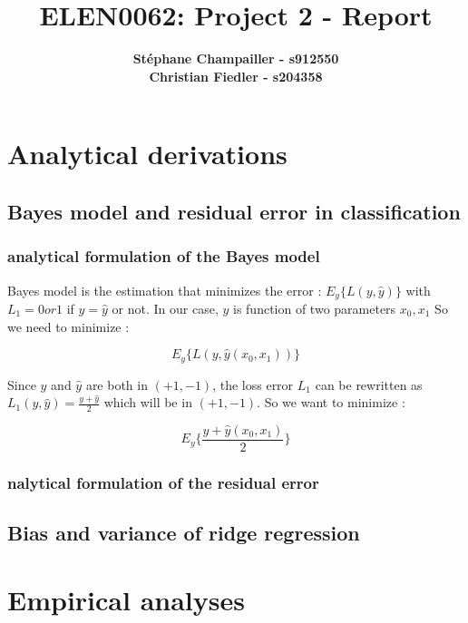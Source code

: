 \documentclass{article}
\begin{document}

\title{\Large{ELEN0062: Project 2 - Report}}
\vspace{1cm}
\author{\small{\bf Stéphane Champailler - s912550 } \\ \small{\bf Christian Fiedler - s204358}}



\maketitle


\def\picwidth{8cm}

\section{Analytical derivations}
\subsection{Bayes model and residual error in classification}
\subsubsection{analytical formulation of the Bayes model}

Bayes model is the estimation that minimizes the error :
$E_y\{ L(y,\hat{y})\}$ with  $L_1 = 0 or 1 $ if $y = \hat{y}$ or not.
In our case, $y$ is function of two parameters $x_0,x_1$
So we need to minimize :

$$ E_y\{ L(y,\hat{y}(x_0,x_1))\} $$

Since $y$ and $\hat{y}$ are both in $(+1,-1)$, the loss error $L_1$
can be rewritten as $L_1(y,\hat{y}) = \frac{y + \hat{y}}{2}$ which will
be in $(+1,-1)$. So we want to minimize :

$$ E_y\{ \frac{y + \hat{y}(x_0,x_1)}{2}\} $$






\subsubsection{nalytical formulation of the residual error}

\subsection{Bias and variance of ridge regression}

\section{Empirical analyses}
\end{document}
